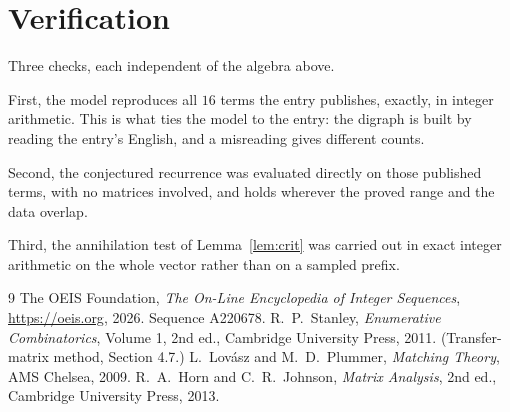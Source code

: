 \documentclass[11pt,a4paper]{article}
\theoremstyle{plain}
\theoremstyle{definition}
\begin{document}
\section{Verification}

Three checks, each independent of the algebra above.

First, the model reproduces all $16$ terms the entry publishes, exactly, in integer
arithmetic. This is what ties the model to the entry: the digraph is built by reading the
entry's English, and a misreading gives different counts.

Second, the conjectured recurrence was evaluated directly on those published terms, with no
matrices involved, and holds wherever the proved range and the data overlap.

Third, the annihilation test of Lemma~\ref{lem:crit} was carried out in exact integer
arithmetic on the whole vector rather than on a sampled prefix.

\begin{thebibliography}{9}
 The OEIS Foundation, \emph{The On-Line Encyclopedia of Integer
Sequences}, \url{https://oeis.org}, 2026. Sequence A220678.
 R.~P.~Stanley, \emph{Enumerative Combinatorics}, Volume 1, 2nd ed.,
Cambridge University Press, 2011. (Transfer-matrix method, Section 4.7.)
 L.~Lov\'asz and M.~D.~Plummer, \emph{Matching Theory}, AMS Chelsea,
2009.
 R.~A.~Horn and C.~R.~Johnson, \emph{Matrix Analysis}, 2nd ed., Cambridge
University Press, 2013.
\end{thebibliography}
\end{document}
